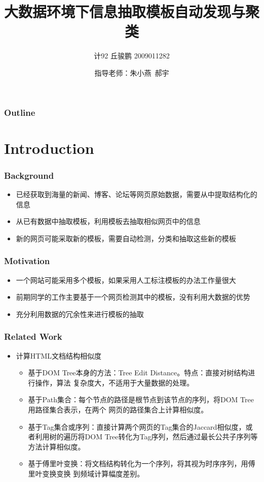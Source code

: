 \documentclass[11pt,presentation]{beamer}
\title{大数据环境下信息抽取模板自动发现与聚类}
\author{计92 丘骏鹏 2009011282}
\date{指导老师：朱小燕~郝宇}
\begin{document}
\maketitle

\begin{frame}
\frametitle{Outline}
\setcounter{tocdepth}{3}
\tableofcontents
\end{frame}


\section{Introduction}
\label{sec-1}
\begin{frame}
\frametitle{Background}
\label{sec-1-1}

\begin{itemize}
\item 已经获取到海量的新闻、博客、论坛等网页原始数据，需要从中提取结构化的信息
\item 从已有数据中抽取模板，利用模板去抽取相似网页中的信息
\item 新的网页可能采取新的模板，需要自动检测，分类和抽取这些新的模板
\end{itemize}
\end{frame}
\begin{frame}
\frametitle{Motivation}
\label{sec-1-2}

\begin{itemize}
\item 一个网站可能采用多个模板，如果采用人工标注模板的办法工作量很大
\item 前期同学的工作主要基于一个网页检测其中的模板，没有利用大数据的优势
\item 充分利用数据的冗余性来进行模板的抽取
\end{itemize}
\end{frame}
\begin{frame}
\frametitle{Related Work}
\label{sec-1-3}
\begin{itemize}

\item 计算HTML文档结构相似度
\label{sec-1-3-1}%
\begin{itemize}
\item 基于DOM Tree本身的方法：Tree Edit Distance\cite{1}。特点：直接对树结构进行操作，算法
     复杂度大，不适用于大量数据的处理。
\item 基于Path集合：每个节点的路径是根节点到该节点的序列，将DOM Tree用路径集合表示，在两个
     网页的路径集合上计算相似度\cite{4,5,6}。
\item 基于Tag集合或序列：直接计算两个网页的Tag集合的Jaccard相似度，或者利用树的遍历将DOM
     Tree转化为Tag序列，然后通过最长公共子序列等方法计算相似度\cite{4,5,8}。
\item 基于傅里叶变换：将文档结构转化为一个序列，将其视为时序序列，用傅里叶变换变换
     到频域计算幅度差别\cite{4,7}。
\end{itemize}

\end{itemize} %
\end{frame}
\end{document}
